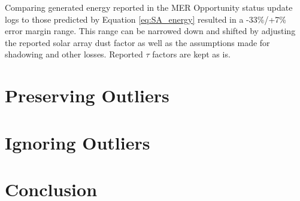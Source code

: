 Comparing generated energy reported in the \ac{MER} Opportunity status update logs to those predicted by Equation \ref{eq:SA_energy} resulted in a -33\%/+7\% error margin range. This range can be narrowed down and shifted by adjusting the reported solar array dust factor as well as the assumptions made for shadowing and other losses. Reported $\tau$ factors are kept as is.

\section{Preserving Outliers}
\label{sec:Appendix:NarrowedEnergyPredictionErrorMarginRange:PreservingOutliers}

\clearpage

\section{Ignoring Outliers}
\label{sec:Appendix:NarrowedEnergyPredictionErrorMarginRange:IgnoringOutliers}

\clearpage

\section{Conclusion}
\label{sec:Appendix:NarrowedEnergyPredictionErrorMarginRange:Conclusion}

\clearpage
